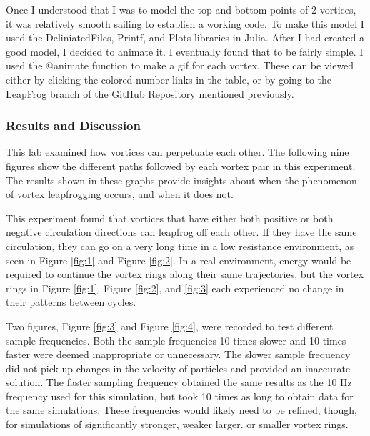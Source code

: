 \documentclass{article}
\begin{document}
{Once I understood that I was to model the top and bottom points of 2 vortices, it was relatively smooth sailing to establish a working code. To make this model I used the DeliniatedFiles, Printf, and Plots libraries in Julia. After I had created a good model, I decided to animate it. I eventually found that to be fairly simple. I used the \textcolor{Dandelion}{@animate} function to make a gif for each vortex. These can be viewed either by clicking the colored number links in the table, or by going to the LeapFrog branch of the \href{https://github.com/JoeSpencer1/497R-Projects.git}{GitHub Repository} mentioned previously. \newline

\subsubsection*{Results and Discussion}

This lab examined how vortices can perpetuate each other. The following nine figures show the different paths followed by each vortex pair in this experiment. The results shown in these graphs provide insights about when the phenomenon of vortex leapfrogging occurs, and when it does not.\newline

This experiment found that vortices that have either both positive or both negative circulation directions can leapfrog off each other. If they have the same circulation, they can go on a very long time in a low resistance environment, as seen in Figure \ref{fig:1} and Figure \ref{fig:2}. In a real environment, energy would be required to continue the vortex rings along their same trajectories, but the vortex rings in Figure \ref{fig:1}, Figure \ref{fig:2}, and \ref{fig:3} each experienced no change in their patterns between cycles. \newline

Two figures, Figure \ref{fig:3} and Figure \ref{fig:4}, were recorded to test different sample frequencies. Both the sample frequencies 10 times slower and 10 times faster were deemed inappropriate or unnecessary. The slower sample frequency did not pick up changes in the velocity of particles and provided an inaccurate solution. The faster sampling frequency obtained the same results as the 10 Hz frequency used for this simulation, but took 10 times as long to obtain data for the same simulations. These frequencies would likely need to be refined, though, for simulations of significantly stronger, weaker larger. or smaller vortex rings. \newline

}
\end{document}
